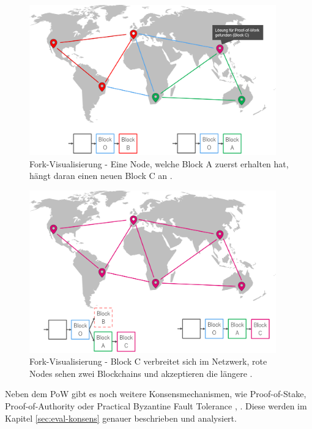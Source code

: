 \begin{figure}[!htbp]
  \centering
	\includegraphics[width=0.95\textwidth,angle=0]{images/fork_3}
 	\caption{Fork-Visualisierung - Eine Node, welche Block A zuerst erhalten hat, hängt daran einen neuen Block C an \cite{AntonopoulosMasteringbitcoin2015}.}
	\label{fig:fork_3}
\end{figure}

\begin{figure}[!htbp]
  \centering
	\includegraphics[width=0.95\textwidth,angle=0]{images/fork_4}
 	\caption{Fork-Visualisierung - Block C verbreitet sich im Netzwerk, rote Nodes sehen zwei Blockchains und akzeptieren die längere \cite{AntonopoulosMasteringbitcoin2015}.}
	\label{fig:fork_4}
\end{figure}

Neben dem PoW gibt es noch weitere Konsensmechanismen, wie Proof-of-Stake, Proof-of-Authority oder Practical Byzantine Fault Tolerance \cite{SukhwaniPerformanceModelingPBFT2017a}, \cite{DeAngelisPBFTvsproofofauthority2017} . Diese werden im Kapitel \ref{sec:eval-konsens} genauer beschrieben und analysiert.

